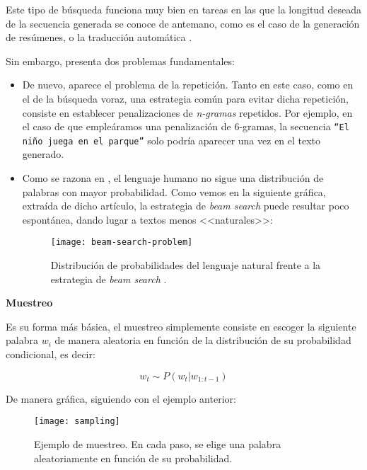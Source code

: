 Este tipo de búsqueda funciona muy bien en tareas en las que la longitud deseada de la secuencia generada se conoce de antemano, como es el caso de la generación de resúmenes, o la traducción automática \cite{murray18, yang18}.

Sin embargo, presenta dos problemas fundamentales:

\vspace*{-\baselineskip}
\begin{itemize}
	\item [\textbullet] De nuevo, aparece el problema de la repetición. Tanto en este caso, como en el de la búsqueda voraz, una estrategia común para evitar dicha repetición, consiste en establecer penalizaciones de \emph{n-gramas} repetidos. Por ejemplo, en el caso de que empleáramos una penalización de 6-gramas, la secuencia \texttt{``El niño juega en el parque''} solo podría aparecer una vez en el texto generado.

	\item [\textbullet] Como se razona en \cite{holtzman20}, el lenguaje humano no sigue una distribución de palabras con mayor probabilidad. Como vemos en la siguiente gráfica, extraída de dicho artículo, la estrategia de \emph{beam search} puede resultar poco espontánea, dando lugar a textos menos <<naturales>>:
	
	\begin{figure}[!h]
		\centering
		\texttt{[image: beam-search-problem]}
		\caption{Distribución de probabilidades del lenguaje natural frente a la estrategia de \emph{beam search} \cite{holtzman20}.}
	\end{figure}
\end{itemize}


\bigskip
\noindent
\textbf{Muestreo}

Es su forma más básica, el muestreo simplemente consiste en escoger la siguiente palabra $w_i$ de manera aleatoria en función de la distribución de su probabilidad condicional, es decir:

\[ w_t \sim P(w_t | w_{1:t-1}) \]

De manera gráfica, siguiendo con el ejemplo anterior:

\begin{figure}[!h]
	\centering
	\texttt{[image: sampling]}
	\caption{Ejemplo de muestreo. En cada paso, se elige una palabra aleatoriamente en función de su probabilidad.}
	\label{fig:muestreo}
\end{figure}

